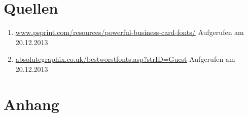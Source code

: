 \documentclass[10pt]{article}
\begin{document}
	

\section{Quellen}
\begin{enumerate}
\item \url{www.psprint.com/resources/powerful-business-card-fonts/} Aufgerufen am 20.12.2013
\item \url{absolutegraphix.co.uk/bestworstfonts.asp?strID=Guest} Aufgerufen am 20.12.2013
\end{enumerate}

\section{Anhang}


\end{document}
